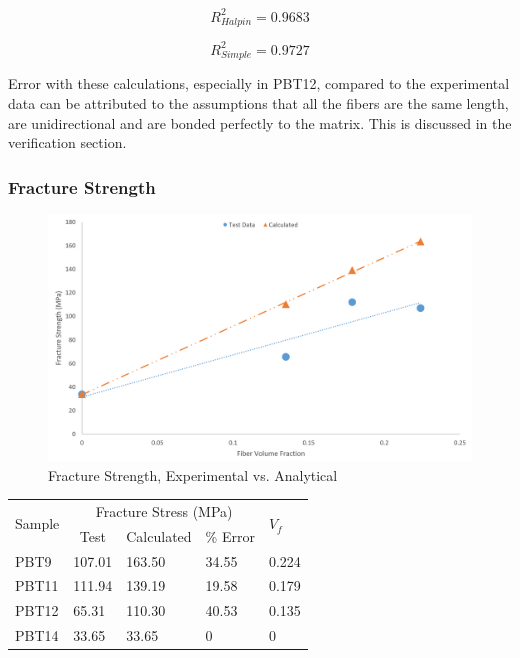 \documentclass[11pt]{article}
\begin{document}
\begin{equation}
R^2_{Halpin} = 0.9683
\end{equation}

\begin{equation}
R^2_{Simple} = 0.9727
\end{equation}

Error with these calculations, especially in PBT12, compared to the experimental data can be attributed to the assumptions that all the fibers are the same length, are unidirectional and are bonded perfectly to the matrix. This is discussed in the verification section.

\subsubsection{Fracture Strength}

\begin{figure}[H]
\centering
\includegraphics[width=.95\linewidth]{figures/fracture_stress_test_vs_calc.png}
\caption{Fracture Strength, Experimental vs. Analytical}
\label{FScompare}
\end{figure}

\onehalfspacing
\begin{center}
 \label{tab:ComparingFracture}
\begin{tabular}{p{1.25cm} ||  p{1.5cm} | p{1.5cm} | p{1.5cm} | p{1cm}}
\hline
 \multirow{2}{*}{Sample} & \multicolumn{3}{c|}{Fracture Stress (MPa)} & \multirow{2}{*}{\(V_f\)} \\
   &  \multicolumn{1}{c}{Test} & \multicolumn{1}{c}{Calculated} & \multicolumn{1}{c|}{\% Error} &\\
\hline
PBT9 & 107.01 & 163.50 & 34.55 & 0.224\\
PBT11 &  111.94 & 139.19 & 19.58 & 0.179\\
PBT12 &  65.31 & 110.30 & 40.53 & 0.135 \\
PBT14 & 33.65 & 33.65 & 0 & 0\\
\hline
\end{tabular}
\end{center}
\singlespacing
\end{document}
